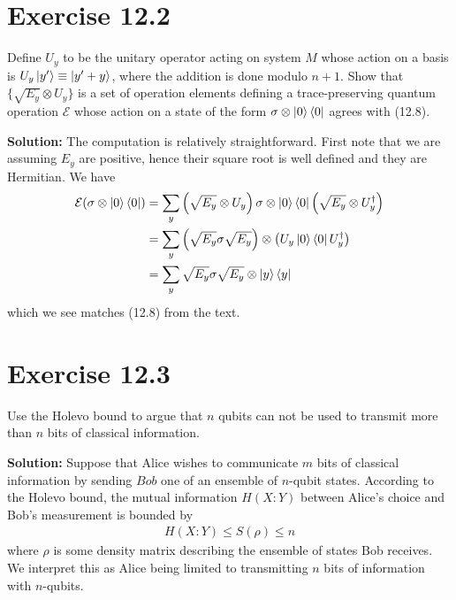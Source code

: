 \documentclass{book}
\newcommand{\mc}[1]{\mathcal{#1}}
\begin{document}
\section*{Exercise 12.2}
    Define $U_y$ to be the unitary operator acting on system $M$ whose action on a basis is $U_y \ket{y'} \equiv \ket{y' + y}$, where the addition is done modulo $n + 1$. Show that $\{\sqrt{E_y} \otimes U_y\}$ is a set of operation elements defining a trace-preserving quantum operation $\mc{E}$ whose action on a state of the form $\sigma \otimes \ket{0}\bra{0}$ agrees with (12.8).
    
    \textbf{Solution:} The computation is relatively straightforward. First note that we are assuming $E_y$ are positive, hence their square root is well defined and they are Hermitian. We have
    \begin{align}
    \begin{aligned}
        \mc{E}(\sigma \otimes \ket{0} \bra{0}) &=\sum_y \left(\sqrt{E_y} \otimes U_y\right) \sigma \otimes \ket{0}\bra{0} \left(\sqrt{E_y} \otimes U_y^\dagger\right) \\
        &= \sum_y \left(\sqrt{E_y} \sigma \sqrt{E_y}\right) \otimes \left(U_y \ket{0}\bra{0} U_y^\dagger\right) \\
        &= \sum_y \sqrt{E_y} \sigma \sqrt{E_y} \otimes \ket{y}\bra{y}
    \end{aligned}
    \end{align}
    which we see matches (12.8) from the text.
    
\section*{Exercise 12.3}
    Use the Holevo bound to argue that $n$ qubits can not be used to transmit more than $n$ bits of classical information.
    
    \textbf{Solution:} Suppose that Alice wishes to communicate $m$ bits of classical information by sending $Bob$ one of an ensemble of $n$-qubit states. According to the Holevo bound, the mutual information $H(X:Y)$ between Alice's choice and Bob's measurement is bounded by
    \begin{align}
        H(X:Y) \leq S(\rho) \leq n
    \end{align}
    where $\rho$ is some density matrix describing the ensemble of states Bob receives. We interpret this as Alice being limited to transmitting $n$ bits of information with $n$-qubits.
    
\end{document}
